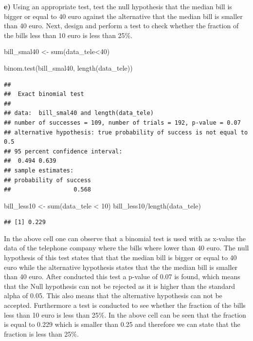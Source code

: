 \documentclass[
]{article}
\newenvironment{Shaded}{\begin{snugshade}}{\end{snugshade}}
\newcommand{\DecValTok}[1]{\textcolor[rgb]{0.00,0.00,0.81}{#1}}
\newcommand{\FunctionTok}[1]{\textcolor[rgb]{0.00,0.00,0.00}{#1}}
\newcommand{\NormalTok}[1]{#1}
\newcommand{\OtherTok}[1]{\textcolor[rgb]{0.56,0.35,0.01}{#1}}
\newcommand{\SpecialCharTok}[1]{\textcolor[rgb]{0.00,0.00,0.00}{#1}}
\begin{document}
\textbf{e)} Using an appropriate test, test the null hypothesis that the
median bill is bigger or equal to 40 euro against the alternative that
the median bill is smaller than 40 euro. Next, design and perform a test
to check whether the fraction of the bills less than 10 euro is less
than 25\%.

\begin{Shaded}
\begin{Highlighting}[]
\NormalTok{bill\_smal40 }\OtherTok{\textless{}{-}} \FunctionTok{sum}\NormalTok{(data\_tele}\SpecialCharTok{\textless{}}\DecValTok{40}\NormalTok{)}

\FunctionTok{binom.test}\NormalTok{(bill\_smal40, }\FunctionTok{length}\NormalTok{(data\_tele))}
\end{Highlighting}
\end{Shaded}

\begin{verbatim}
## 
##  Exact binomial test
## 
## data:  bill_smal40 and length(data_tele)
## number of successes = 109, number of trials = 192, p-value = 0.07
## alternative hypothesis: true probability of success is not equal to 0.5
## 95 percent confidence interval:
##  0.494 0.639
## sample estimates:
## probability of success 
##                  0.568
\end{verbatim}

\begin{Shaded}
\begin{Highlighting}[]
\NormalTok{bill\_less10 }\OtherTok{\textless{}{-}} \FunctionTok{sum}\NormalTok{(data\_tele }\SpecialCharTok{\textless{}} \DecValTok{10}\NormalTok{)}
\NormalTok{bill\_less10}\SpecialCharTok{/}\FunctionTok{length}\NormalTok{(data\_tele)}
\end{Highlighting}
\end{Shaded}

\begin{verbatim}
## [1] 0.229
\end{verbatim}

In the above cell one can observe that a binomial test is used with as
x-value the data of the telephone company where the bills where lower
than 40 euro. The null hypothesis of this test states that that the
median bill is bigger or equal to 40 euro while the alternative
hypothesis states that the the median bill is smaller than 40 euro.
After conducted this test a p-value of 0.07 is found, which means that
the Null hypothesis can not be rejected as it is higher than the
standard alpha of 0.05. This also means that the alternative hypothesis
can not be accepted. Furthermore a test is conducted to see whether the
fraction of the bills less than 10 euro is less than 25\%. In the above
cell can be seen that the fraction is equal to 0.229 which is smaller
than 0.25 and therefore we can state that the fraction is less than
25\%.
\end{document}
